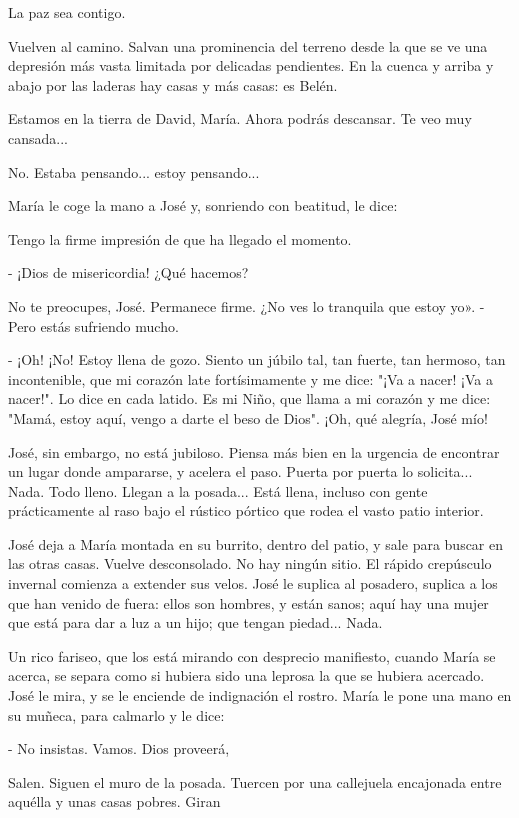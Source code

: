 \documentclass[12pt, twoside, openright]{book} %
\begin{document}
La paz sea contigo. 

Vuelven al camino. Salvan una prominencia del terreno desde la que se ve una depresión más vasta limitada por delicadas pendientes. En la cuenca y arriba y abajo por las laderas hay casas y más casas: es Belén. 

Estamos en la tierra de David, María. Ahora podrás descansar. Te veo muy cansada... 

No. Estaba pensando... estoy pensando... 

María le coge la mano a José y, sonriendo con beatitud, le dice: 

Tengo la firme impresión de que ha llegado el momento. 

- ¡Dios de misericordia! ¿Qué hacemos? 

No te preocupes, José. Permanece firme. ¿No ves lo tranquila que estoy yo». - Pero estás sufriendo mucho. 

- ¡Oh! ¡No! Estoy llena de gozo. Siento un júbilo tal, tan fuerte, tan hermoso, tan incontenible, que mi corazón late fortísimamente y me dice: "¡Va a nacer! ¡Va a nacer!". Lo dice en cada latido. Es mi Niño, que llama a mi corazón y me dice: "Mamá, estoy aquí, vengo a darte el beso de Dios". ¡Oh, qué alegría, José mío! 

José, sin embargo, no está jubiloso. Piensa más bien en la urgencia de encontrar un lugar donde ampararse, y acelera el paso. Puerta por puerta lo solicita... Nada. Todo lleno. Llegan a la posada... Está llena, incluso con gente prácticamente al raso bajo el rústico pórtico que rodea el vasto patio interior. 

José deja a María montada en su burrito, dentro del patio, y sale para buscar en las otras casas. Vuelve desconsolado. No hay ningún sitio. El rápido crepúsculo invernal comienza a extender sus velos. José le suplica al posadero, suplica a los que han venido de fuera: ellos son hombres, y están sanos; aquí hay una mujer que está para dar a luz a un hijo; que tengan piedad... Nada. 

Un rico fariseo, que los está mirando con desprecio manifiesto, cuando María se acerca, se separa como si hubiera sido una leprosa la que se hubiera acercado. José le mira, y se le enciende de indignación el rostro. María le pone una mano en su muñeca, para calmarlo y le dice: 

- No insistas. Vamos. Dios proveerá, 

Salen. Siguen el muro de la posada. Tuercen por una callejuela encajonada entre aquélla y unas casas pobres. Giran 
\end{document}
